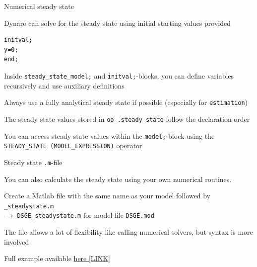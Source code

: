 \documentclass[handout,usepdftitle=false,xcolor=dvipsnames,aspectratio=169]{beamer}
\begin{document}
\begin{frame}[fragile]{Numerical steady state}
\begin{witemize}
    \item Dynare can solve for the steady state using initial starting values provided
\begin{verbatim}
initval;
y=0;
end;
\end{verbatim}
    \item Inside \texttt{steady\_state\_model;} and \texttt{initval;}-blocks, you can define variables recursively and use auxiliary definitions
    \item Always use a fully analytical steady state if possible (especially for \texttt{estimation})
    \item The steady state values stored in \texttt{oo\_.steady\_state} follow the declaration order
    \item You can access steady state values within the \texttt{model;}-block using the \texttt{STEADY\_STATE (MODEL\_EXPRESSION)} operator
\end{witemize}
\end{frame}

\begin{frame}[fragile]{Steady state \texttt{.m}-file}
\begin{witemize}
    \item You can also calculate the steady state using your own numerical routines.
    \item Create a Matlab file with the same name as your model followed by \texttt{\_steadystate.m}\\
    $\rightarrow$ \texttt{DSGE\_steadystate.m} for model file \texttt{DSGE.mod}
    \item The file allows a lot of flexibility like calling numerical solvers, but syntax is more involved
    \item Full example available \href{https://git.dynare.org/Dynare/dynare/-/blob/master/examples/NK_baseline_steadystate.m}{here [LINK]}
\end{witemize}
\end{frame}
\end{document}
